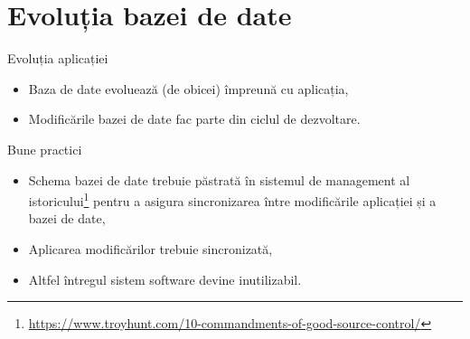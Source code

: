 \documentclass[presentation]{beamer}
\begin{document}
\section{Evoluția bazei de date}
\label{sec:orga0f5082}
\begin{frame}[label={sec:orgc8b64a2}]{Evoluția aplicației}
\begin{itemize}
\item Baza de date evoluează (de obicei) împreună cu aplicația,
\item Modificările bazei de date fac parte din ciclul de dezvoltare.
\end{itemize}
\end{frame}
\begin{frame}[label={sec:org6e62fd7}]{Bune practici}
\begin{itemize}
\item Schema bazei de date trebuie păstrată în sistemul de management al istoricului\footnote{\url{https://www.troyhunt.com/10-commandments-of-good-source-control/}} pentru a asigura sincronizarea între modificările aplicației și a bazei de date,
\item Aplicarea modificărilor trebuie sincronizată,
\item Altfel întregul sistem software devine inutilizabil.
\end{itemize}
\end{frame}
\end{document}
